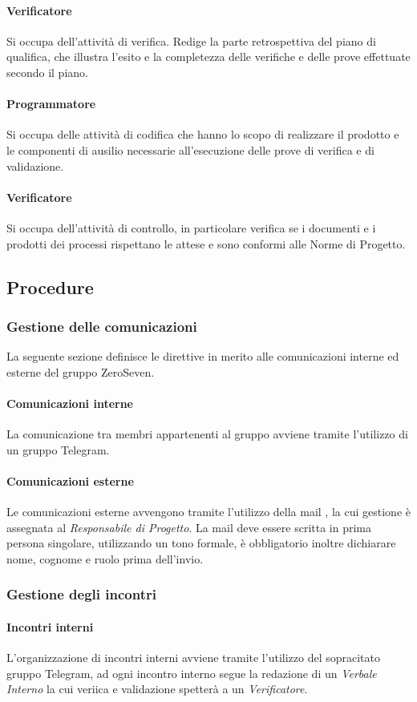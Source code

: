 \paragraph{Verificatore} Si occupa dell'attività di verifica. Redige la parte retrospettiva del piano di qualifica, che illustra l'esito e la completezza delle verifiche e delle prove effettuate secondo il piano. 
\paragraph{Programmatore} Si occupa delle attività di codifica che hanno lo scopo di realizzare il prodotto e le componenti di ausilio necessarie all'esecuzione delle prove di verifica e di validazione. 
\paragraph{Verificatore} Si occupa dell'attività di controllo, in particolare verifica se i documenti e i prodotti dei processi rispettano le attese e sono conformi alle Norme di Progetto.
\subsection{Procedure}
\subsubsection{Gestione delle comunicazioni}
La seguente sezione definisce le direttive in merito alle comunicazioni interne ed esterne del gruppo ZeroSeven.
\paragraph{Comunicazioni interne}
La comunicazione tra membri appartenenti al gruppo avviene tramite l'utilizzo di un gruppo Telegram.
\paragraph{Comunicazioni esterne}
Le comunicazioni esterne avvengono tramite l'utilizzo della mail \mailleaf, la cui gestione è assegnata al \textit{Responsabile di Progetto}.
La mail deve essere scritta in prima persona singolare, utilizzando un tono formale, è obbligatorio inoltre dichiarare nome, cognome e ruolo prima dell'invio.
\subsubsection{Gestione degli incontri}
\paragraph{Incontri interni} L'organizzazione di incontri interni avviene tramite l'utilizzo del sopracitato gruppo Telegram, ad ogni incontro interno segue la redazione di un \textit{Verbale Interno} la cui veriica e validazione spetterà a un \textit{Verificatore}.
